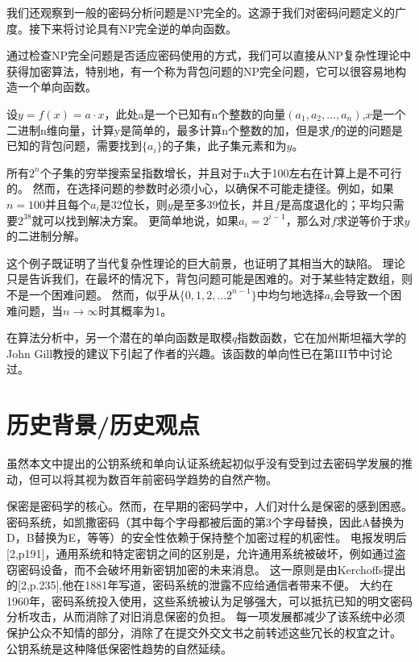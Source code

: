 \documentclass[]{article}
\begin{document}
	
	我们还观察到一般的密码分析问题是NP完全的。这源于我们对密码问题定义的广度。接下来将讨论具有NP完全逆的单向函数。
	
	通过检查NP完全问题是否适应密码使用的方式，我们可以直接从NP复杂性理论中获得加密算法，特别地，有一个称为背包问题的NP完全问题，它可以很容易地构造一个单向函数。
	
	设$y=f(x)=a\cdot x$，此处a是一个已知有n个整数的向量$(a_1,a_2,\ldots,a_n)$,$x$是一个二进制n维向量，计算y是简单的，最多计算n个整数的加，但是求$f$的逆的问题是已知的背包问题，需要找到$\{a_i\}$的子集，此子集元素和为$y$。
	
	所有$2^n$个子集的穷举搜索呈指数增长，并且对于n大于100左右在计算上是不可行的。
	然而，在选择问题的参数时必须小心，以确保不可能走捷径。例如，如果$n=10$0并且每个$a_i$是32位长，则$y$是至多39位长，并且$f$是高度退化的；平均只需要$2^38$就可以找到解决方案。
	更简单地说，如果$a_i=2^{i-1}$，那么对$f$求逆等价于求$y$的二进制分解。
	
	这个例子既证明了当代复杂性理论的巨大前景，也证明了其相当大的缺陷。
	理论只是告诉我们，在最坏的情况下，背包问题可能是困难的。对于某些特定数组，则不是一个困难问题。
	然而，似乎从$\{0,1,2,\ldots2^{n-1}\}$中均匀地选择$a_i$会导致一个困难问题，当$n\rightarrow \infty$时其概率为1。
	
	在算法分析中，另一个潜在的单向函数是取模$q$指数函数，它在加州斯坦福大学的John Gill教授的建议下引起了作者的兴趣。该函数的单向性已在第III节中讨论过。
	
	\section{ 历史背景/历史观点}
	
	虽然本文中提出的公钥系统和单向认证系统起初似乎没有受到过去密码学发展的推动，但可以将其视为数百年前密码学趋势的自然产物。
	
	
	保密是密码学的核心。然而，在早期的密码学中，人们对什么是保密的感到困惑。
	密码系统，如凯撒密码（其中每个字母都被后面的第3个字母替换，因此A替换为D，B替换为E，等等）的安全性依赖于保持整个加密过程的机密性。
	电报发明后[2,p191]，通用系统和特定密钥之间的区别是，允许通用系统被破坏，例如通过盗窃密码设备，而不会破坏用新密钥加密的未来消息。
	这一原则是由Kerchoffs提出的[2,p.235],他在1881年写道，密码系统的泄露不应给通信者带来不便。
	大约在1960年，密码系统投入使用，这些系统被认为足够强大，可以抵抗已知的明文密码分析攻击，从而消除了对旧消息保密的负担。
	每一项发展都减少了该系统中必须保护公众不知情的部分，消除了在提交外交文书之前转述这些冗长的权宜之计。
	公钥系统是这种降低保密性趋势的自然延续。
	
\end{document}
